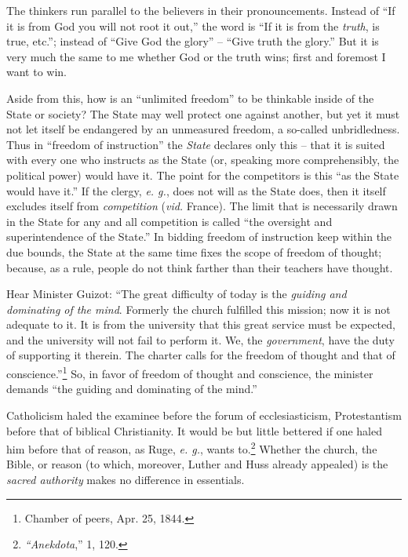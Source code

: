 \documentclass[12pt,a4paper]{book}
\begin{document}
The thinkers run parallel to the believers in their pronouncements. Instead of 
``If it is from God you will not root it out,'' the word is ``If it is from 
the \textit{truth}, is true, etc.''; instead of ``Give God the glory'' -- 
``Give truth the glory.'' But it is very much the same to me whether God or 
the truth wins; first and foremost I want to win.

Aside from this, how is an ``unlimited freedom'' to be thinkable inside of 
the State or society? The State may well protect one against another, but yet 
it must not let itself be endangered by an unmeasured freedom, a so-called 
unbridledness. Thus in ``freedom of instruction'' the \textit{State} 
declares only this -- that it is suited with every one who instructs as the 
State (or, speaking more comprehensibly, the political power) would have it. 
The point for the competitors is this ``as the State would have it.'' If the 
clergy, \textit{e. g.}, does not will as the State does, then it itself 
excludes itself from \textit{competition} (\textit{vid.} France). The limit 
that is necessarily drawn in the State for any and all competition is called 
``the oversight and superintendence of the State.'' In bidding freedom of 
instruction keep within the due bounds, the State at the same time fixes the 
scope of freedom of thought; because, as a rule, people do not think farther 
than their teachers have thought.

Hear Minister Guizot: ``The great difficulty of today is the \textit{guiding 
and dominating of the mind}. Formerly the church fulfilled this mission; now 
it is not adequate to it. It is from the university that this great service 
must be expected, and the university will not fail to perform it. We, the 
\textit{government}, have the duty of supporting it therein. The charter calls 
for the freedom of thought and that of conscience.''\footnote{Chamber of 
peers, Apr. 25, 1844.} So, in favor of freedom of thought and conscience, the 
minister demands ``the guiding and dominating of the mind.''

Catholicism haled the examinee before the forum of ecclesiasticism, 
Protestantism before that of biblical Christianity. It would be but little 
bettered if one haled him before that of reason, as Ruge, \textit{e. g.}, 
wants to.\footnote{\textit{``Anekdota},'' 1, 120.} Whether the church, the 
Bible, or reason (to which, moreover, Luther and Huss already appealed) is the 
\textit{sacred authority} makes no difference in essentials.
\end{document}
